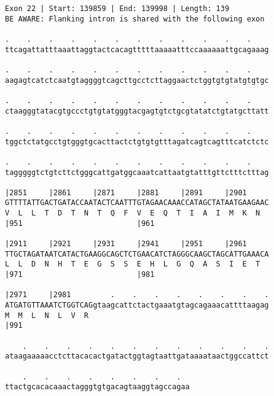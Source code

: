 \documentclass{article}
\begin{document}
\begin{Verbatim}
Exon 22 | Start: 139859 | End: 139998 | Length: 139
BE AWARE: Flanking intron is shared with the following exon
 
.    .    .    .    .    .    .    .    .    .    .    .    
ttcagattatttaaattaggtactcacagtttttaaaaatttccaaaaaattgcagaaag
  
.    .    .    .    .    .    .    .    .    .    .    .    
aagagtcatctcaatgtaggggtcagcttgcctcttaggaactctggtgtgtatgtgtgc
  
.    .    .    .    .    .    .    .    .    .    .    .    
ctaagggtatacgtgccctgtgtatgggtacgagtgtctgcgtatatctgtatgcttatt
  
.    .    .    .    .    .    .    .    .    .    .    .    
tggctctatgcctgtgggtgcacttactctgtgtgtttagatcagtcagtttcatctctc
  
.    .    .    .    .    .    .    .    .    .    .    .    
tagggggtctgtcttctgggcattgatggcaaatcattaatgtatttgttctttctttag
  
|2851     |2861     |2871     |2881     |2891     |2901     
GTTTTATTGACTGATACCAATACTCAATTTGTAGAACAAACCATAGCTATAATGAAGAAC
V  L  L  T  D  T  N  T  Q  F  V  E  Q  T  I  A  I  M  K  N  
|951                          |961                          
  
|2911     |2921     |2931     |2941     |2951     |2961     
TTGCTAGATAATCATACTGAAGGCAGCTCTGAACATCTAGGGCAAGCTAGCATTGAAACA
L  L  D  N  H  T  E  G  S  S  E  H  L  G  Q  A  S  I  E  T  
|971                          |981                          
  
|2971     |2981         .    .    .    .    .    .    .    .
ATGATGTTAAATCTGGTCAGgtaagcattctactgaaatgtagcagaaacattttaagag
M  M  L  N  L  V  R                                         
|991                                                        
  
    .    .    .    .    .    .    .    .    .    .    .    .
ataagaaaaacctcttacacactgatactggtagtaattgataaaataactggccattct
  
    .    .    .    .    .    .    .    .  
ttactgcacacaaactagggtgtgacagtaaggtagccagaa
\end{Verbatim}
\newpage
\end{document}
